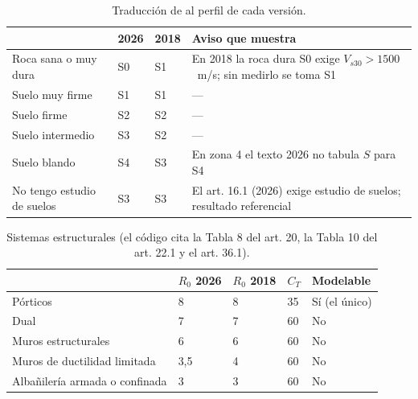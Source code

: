 \begin{table}[H]
	\centering
	\begin{tabular}{L{3.6cm}L{1.6cm}L{1.6cm}L{6.4cm}}
		\hline
		\textbf{} & \textbf{2026} & \textbf{2018} & \textbf{Aviso que muestra} \\ \hline
		Roca sana o muy dura & S0 & S1 & En 2018 la roca dura S0 exige $V_{s30} > 1500$~m/s; sin medirlo se toma S1 \\
		Suelo muy firme & S1 & S1 & --- \\
		Suelo firme & S2 & S2 & --- \\
		Suelo intermedio & S3 & S2 & --- \\
		Suelo blando & S4 & S3 & En zona 4 el texto 2026 no tabula $S$ para S4 \\
		No tengo estudio de suelos & S3 & S3 & El art. 16.1 (2026) exige estudio de suelos; resultado referencial \\ \hline
	\end{tabular}
	\caption{Traducción de  al perfil de cada versión.}
	\label{tab:sis-tiposuelo}
\end{table}

\begin{table}[H]
	\centering
	\begin{tabular}{L{4.2cm}L{1.5cm}L{1.5cm}L{0.9cm}L{3.9cm}}
		\hline
		\textbf{} & \textbf{$R_0$ 2026} & \textbf{$R_0$ 2018} & \textbf{$C_T$} & \textbf{Modelable} \\ \hline
		Pórticos & 8 & 8 & 35 & Sí (el único) \\
		Dual & 7 & 7 & 60 & No \\
		Muros estructurales & 6 & 6 & 60 & No \\
		Muros de ductilidad limitada & 3,5 & 4 & 60 & No \\
		Albañilería armada o confinada & 3 & 3 & 60 & No \\ \hline
	\end{tabular}
	\caption{Sistemas estructurales (el código cita la Tabla 8 del art. 20, la Tabla 10 del art. 22.1 y el art. 36.1).}
	\label{tab:sis-sistema}
\end{table}

